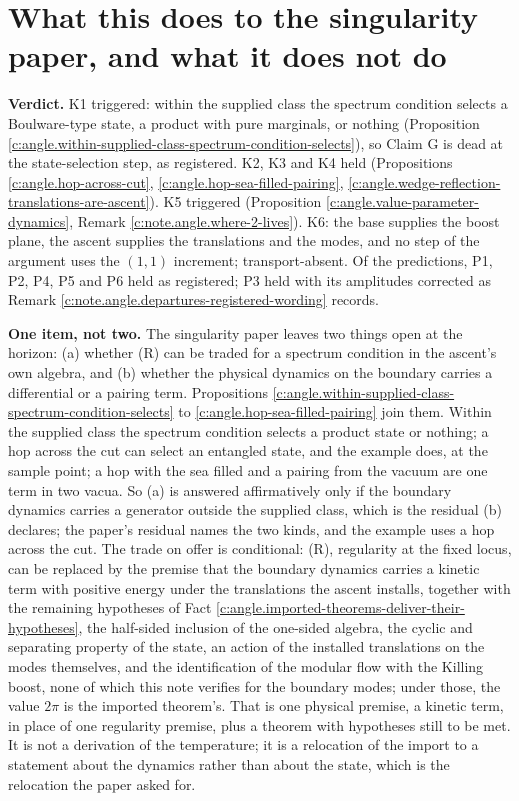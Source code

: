 \documentclass[11pt]{article}
\theoremstyle{definition}
\theoremstyle{plain}
\begin{document}
\section{What this does to the singularity paper, and what it does not do}

\label{c:note.angle.setting-what-does-singularity-paper-what}
\textbf{Verdict.} K1 triggered: within the supplied class the spectrum condition selects a Boulware-type state, a product with pure marginals, or nothing (Proposition \ref{c:angle.within-supplied-class-spectrum-condition-selects}), so Claim G is dead at the state-selection step, as registered. K2, K3 and K4 held (Propositions \ref{c:angle.hop-across-cut}, \ref{c:angle.hop-sea-filled-pairing}, \ref{c:angle.wedge-reflection-translations-are-ascent}). K5 triggered (Proposition \ref{c:angle.value-parameter-dynamics}, Remark \ref{c:note.angle.where-2-lives}). K6: the base supplies the boost plane, the ascent supplies the translations and the modes, and no step of the argument uses the $(1,1)$ increment; transport-absent. Of the predictions, P1, P2, P4, P5 and P6 held as registered; P3 held with its amplitudes corrected as Remark \ref{c:note.angle.departures-registered-wording} records.

\label{c:note.angle.setting-what-does-singularity-paper-what-2}
\textbf{One item, not two.} The singularity paper leaves two things open at the horizon: (a) whether (R) can be traded for a spectrum condition in the ascent's own algebra, and (b) whether the physical dynamics on the boundary carries a differential or a pairing term. Propositions \ref{c:angle.within-supplied-class-spectrum-condition-selects} to \ref{c:angle.hop-sea-filled-pairing} join them. Within the supplied class the spectrum condition selects a product state or nothing; a hop across the cut can select an entangled state, and the example does, at the sample point; a hop with the sea filled and a pairing from the vacuum are one term in two vacua. So (a) is answered affirmatively only if the boundary dynamics carries a generator outside the supplied class, which is the residual (b) declares; the paper's residual names the two kinds, and the example uses a hop across the cut. The trade on offer is conditional: (R), regularity at the fixed locus, can be replaced by the premise that the boundary dynamics carries a kinetic term with positive energy under the translations the ascent installs, together with the remaining hypotheses of Fact \ref{c:angle.imported-theorems-deliver-their-hypotheses}, the half-sided inclusion of the one-sided algebra, the cyclic and separating property of the state, an action of the installed translations on the modes themselves, and the identification of the modular flow with the Killing boost, none of which this note verifies for the boundary modes; under those, the value $2\pi$ is the imported theorem's. That is one physical premise, a kinetic term, in place of one regularity premise, plus a theorem with hypotheses still to be met. It is not a derivation of the temperature; it is a relocation of the import to a statement about the dynamics rather than about the state, which is the relocation the paper asked for.
\end{document}
